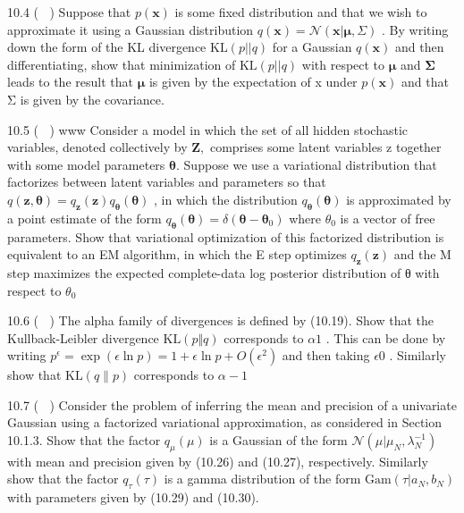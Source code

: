 \documentclass[
  10
]{article}
\begin{document}
10.4 ( ) Suppose that \(p ( \mathbf { x } )\) is some fixed distribution
and that we wish to approximate it using a Gaussian distribution
\(q ( \mathbf { x } ) = \mathcal { N } ( \mathbf { x } | \boldsymbol { \mu } , \Sigma )\)
. By writing down the form of the KL divergence
\(\mathrm { K L } ( p | | q )\) for a Gaussian \(q ( \mathbf { x } )\)
and then differentiating, show that minimization of
\(\mathrm { K L } ( p | | q )\) with respect to \(\pmb { \mu }\) and
\(\pmb { \Sigma }\) leads to the result that \(\pmb { \mu }\) is given
by the expectation of x under \(p ( \mathbf { x } )\) and that Σ is
given by the covariance.

10.5 ( ) www Consider a model in which the set of all hidden stochastic
variables, denoted collectively by \(\mathbf { Z } ,\) comprises some
latent variables z together with some model parameters
\(\pmb { \theta } .\) Suppose we use a variational distribution that
factorizes between latent variables and parameters so that
\(q ( \mathbf { z } , \pmb { \theta } ) = q _ { \mathbf { z } } ( \mathbf { z } ) q _ { \pmb { \theta } } ( \pmb { \theta } )\)
, in which the distribution
\(q _ { \pmb { \theta } } ( \pmb { \theta } )\) is approximated by a
point estimate of the form
\({ q } _ { \pmb { \theta } } ( \pmb { \theta } ) = \delta ( \pmb { \theta } - \pmb { \theta } _ { 0 } )\)
where \(\theta _ { 0 }\) is a vector of free parameters. Show that
variational optimization of this factorized distribution is equivalent
to an EM algorithm, in which the E step optimizes
\(q _ { \mathbf { z } } ( \mathbf { z } )\) and the M step maximizes the
expected complete-data log posterior distribution of θ with respect to
\(\theta _ { 0 }\)

10.6 ( ) The alpha family of divergences is defined by (10.19). Show
that the Kullback-Leibler divergence \(\mathrm { K L } ( p \Vert q )\)
corresponds to \(\alpha  1\) . This can be done by writing
\(p ^ { \epsilon } = \exp ( \epsilon \ln p ) = 1 + \epsilon \ln p + O ( \epsilon ^ { 2 } )\)
and then taking \(\epsilon  0\) . Similarly show that
\(\mathrm { K L } ( q \| p )\) corresponds to \(\alpha  - 1\)

10.7 ( ) Consider the problem of inferring the mean and precision of a
univariate Gaussian using a factorized variational approximation, as
considered in Section 10.1.3. Show that the factor
\(q _ { \mu } ( \mu )\) is a Gaussian of the form
\(\mathcal { N } ( \mu \vert \mu _ { N } , \lambda _ { N } ^ { - 1 } )\)
with mean and precision given by (10.26) and (10.27), respectively.
Similarly show that the factor \(q _ { \tau } ( \tau )\) is a gamma
distribution of the form
\({ \mathrm { G a m } } ( \tau | a _ { N } , b _ { N } )\) with
parameters given by (10.29) and (10.30).
\end{document}
